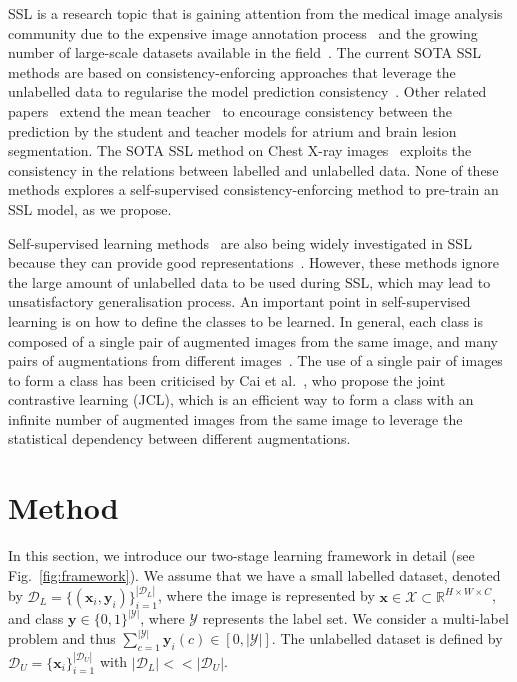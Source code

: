 \documentclass[runningheads]{llncs}
\begin{document}
SSL is a research topic that is gaining attention from the medical image analysis community due to the expensive image annotation process~\cite{cheplygina2019not} and the growing number of large-scale datasets available in the field~\cite{wang2017chestx}. 
The current SOTA SSL methods are based on consistency-enforcing approaches that leverage the unlabelled data to regularise the model prediction consistency~\cite{tarvainen2017mean,laine2016temporal}. 
 Other related papers~\cite{cui2019semi} extend the mean teacher~\cite{tarvainen2017mean} to encourage consistency between the prediction by the student and teacher models for atrium and brain lesion segmentation. 
The SOTA SSL method on Chest X-ray images~\cite{liu2020semi} exploits the consistency in the relations between labelled and unlabelled data. 
None of these methods explores a self-supervised consistency-enforcing  method to pre-train an SSL model, as we propose.

Self-supervised learning methods~\cite{simclr,moco} are also being widely investigated in SSL because they can provide good representations~\cite{chen2020big,zhai2019s4l}. However, these methods ignore the large amount of unlabelled data to be used during SSL, which may lead to unsatisfactory generalisation process. An important point in self-supervised learning is on how to define the classes to be learned.
In general, each class is composed of a single pair of augmented images from the same image, and many pairs of augmentations from different images~\cite{moco,simclr,cai2020joint,chen2020big}.
The use of a single pair of images to form a class has been criticised by Cai et al.~\cite{cai2020joint}, who propose the joint contrastive learning (JCL), which is an efficient way to form a class with an infinite number of augmented images from the same image to leverage the statistical dependency between different augmentations.  









\section{Method}




In this section, we introduce our two-stage learning framework in detail (see Fig.~\ref{fig:framework}). 
We assume that we have a small labelled dataset, denoted by $\mathcal{D}_L = \{ (\mathbf{x}_i,\mathbf{y}_i)\}_{i=1}^{|\mathcal{D}_L|}$, where the image is represented by $\mathbf{x} \in \mathcal{X} \subset \mathbb{R}^{H \times W \times C}$, and class 
$\mathbf{y} \in \{0,1\}^{|\mathcal{Y}|}$, where $\mathcal{Y}$ represents the label set.
We consider a multi-label problem and thus $\sum_{c=1}^{|\mathcal{Y}|}\mathbf{y}_i(c) \in [0,|\mathcal{Y}|]$. The unlabelled dataset is defined by $\mathcal{D}_U = \{ \mathbf{x}_i\}_{i=1}^{|\mathcal{D}_U|}$ with $|\mathcal{D}_L| << |\mathcal{D}_U|$.
\end{document}
